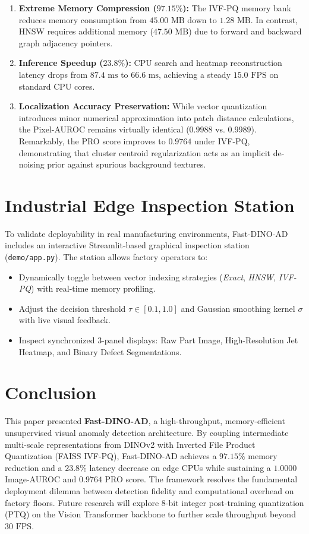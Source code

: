 \documentclass[10pt,journal,compsoc]{IEEEtran}
\begin{document}
\begin{enumerate}
    \item \textbf{Extreme Memory Compression ($97.15\%$):} The IVF-PQ memory bank reduces memory consumption from $45.00\text{ MB}$ down to $1.28\text{ MB}$. In contrast, HNSW requires additional memory ($47.50\text{ MB}$) due to forward and backward graph adjacency pointers.
    \item \textbf{Inference Speedup ($23.8\%$):} CPU search and heatmap reconstruction latency drops from $87.4\text{ ms}$ to $66.6\text{ ms}$, achieving a steady $15.0\text{ FPS}$ on standard CPU cores.
    \item \textbf{Localization Accuracy Preservation:} While vector quantization introduces minor numerical approximation into patch distance calculations, the Pixel-AUROC remains virtually identical ($0.9988$ vs. $0.9989$). Remarkably, the PRO score improves to $0.9764$ under IVF-PQ, demonstrating that cluster centroid regularization acts as an implicit de-noising prior against spurious background textures.
\end{enumerate}

\section{Industrial Edge Inspection Station}
To validate deployability in real manufacturing environments, Fast-DINO-AD includes an interactive Streamlit-based graphical inspection station (\texttt{demo/app.py}). The station allows factory operators to:
\begin{itemize}
    \item Dynamically toggle between vector indexing strategies (\textit{Exact}, \textit{HNSW}, \textit{IVF-PQ}) with real-time memory profiling.
    \item Adjust the decision threshold $\tau \in [0.1, 1.0]$ and Gaussian smoothing kernel $\sigma$ with live visual feedback.
    \item Inspect synchronized 3-panel displays: Raw Part Image, High-Resolution Jet Heatmap, and Binary Defect Segmentations.
\end{itemize}

\section{Conclusion}
This paper presented \textbf{Fast-DINO-AD}, a high-throughput, memory-efficient unsupervised visual anomaly detection architecture. By coupling intermediate multi-scale representations from DINOv2 with Inverted File Product Quantization (FAISS IVF-PQ), Fast-DINO-AD achieves a $97.15\%$ memory reduction and a $23.8\%$ latency decrease on edge CPUs while sustaining a $1.0000$ Image-AUROC and $0.9764$ PRO score. The framework resolves the fundamental deployment dilemma between detection fidelity and computational overhead on factory floors. Future research will explore 8-bit integer post-training quantization (PTQ) on the Vision Transformer backbone to further scale throughput beyond $30\text{ FPS}$.
\end{document}
